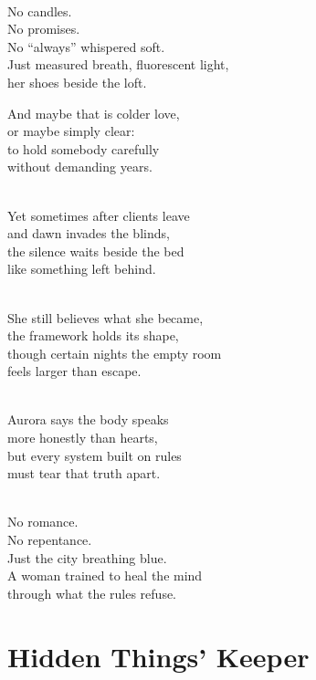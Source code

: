 \begin{lyrics}
\\
No candles.\\
No promises.\\
No “always” whispered soft.\\
Just measured breath, fluorescent light,\\
her shoes beside the loft.

And maybe that is colder love,\\
or maybe simply clear:\\
to hold somebody carefully\\
without demanding years.

\\
Yet sometimes after clients leave\\
and dawn invades the blinds,\\
the silence waits beside the bed\\
like something left behind.

\\
She still believes what she became,\\
the framework holds its shape,\\
though certain nights the empty room\\
feels larger than escape.

\\
Aurora says the body speaks\\
more honestly than hearts,\\
but every system built on rules\\
must tear that truth apart.

\\
No romance.\\
No repentance.\\
Just the city breathing blue.\\
A woman trained to heal the mind\\
through what the rules refuse.

\end{lyrics}

\section{Hidden Things' Keeper}

